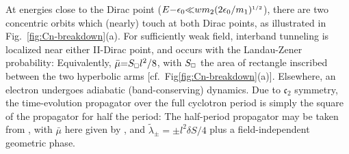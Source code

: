 \documentclass[aps, prb, showpacs, twocolumn, notitlepage, superscriptaddress]{revtex4-1}
\begin{document}






At energies close to the Dirac point ($E{-}\epsilon_0 {\ll} wm_2(2\epsilon_0/m_1)^{\scriptscriptstyle{1/2}}$), there are two concentric orbits which (nearly) touch at both Dirac points, as illustrated in Fig.\ \ref{fig:Cn-breakdown}(a). For sufficiently weak field, interband tunneling is localized near either II-Dirac point, and occurs with the Landau-Zener probability:
Equivalently, $\bar{\mu}{=}S_{\scriptscriptstyle{\square}}l^2/8$, with $S_{\scriptscriptstyle{\square}}$ the area of rectangle inscribed between the two hyperbolic arms [cf.\  Fig\ref{fig:Cn-breakdown}(a)]. Elsewhere, an electron undergoes adiabatic (band-conserving) dynamics. Due to $\mathfrak{c}_2$ symmetry, the time-evolution propagator over the full cyclotron period is simply the square of the propagator for half the period: 
The half-period propagator may be taken from , with  $\bar{\mu}$ here given by , and  $\tilde{\lambda}_{\pm}{=}{\pm}l^2\delta S/4$ plus a field-independent geometric phase.
 


\end{document}
